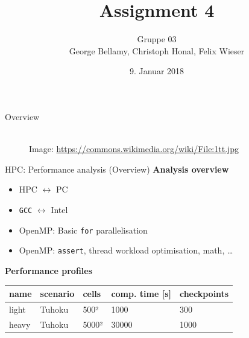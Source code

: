 \documentclass[shortpres,usenames,dvipsnames]{beamer}
\title[{Tsunami simulation}]{Assignment 4}
\author[Bellamy, Honal, Wieser]{Gruppe 03\\George Bellamy, Christoph Honal, Felix Wieser\\\vspace{10pt}{\small Bachelorpraktikum}}
\institute[TU M\"unchen]{Technical University of Munich}
\date{9. Januar 2018}
\begin{document}
		\maketitle
		
\begin{frame}{Overview}
	\begin{figure}
		\hspace{20pt}
		\hspace{40pt}\vspace{10pt}\\
		\vfill
		\flushleft
		{\fontsize{5}{5} \selectfont *Image: \url{https://commons.wikimedia.org/wiki/File:1tt.jpg}}
	\end{figure}
\end{frame}

\begin{frame}[fragile]{HPC: Performance analysis (Overview)}
	\textbf{Analysis overview}
	\begin{itemize}
		\item HPC $\leftrightarrow$ PC
		\item \verb|GCC| $\leftrightarrow$ Intel
		\item OpenMP: Basic \verb|for| parallelisation
		\item OpenMP: \verb|assert|, thread workload optimisation, math, \dots
	\end{itemize}
	
	\vspace{10pt}
	\textbf{Performance profiles}\\
	\begin{tabular}{lllll}
		name & scenario & cells & comp. time [s] & checkpoints\\
		\hline
		light & Tuhoku & 500² & 1000 & 300\\
		heavy & Tuhoku & 5000² & 30000 & 1000\\
	\end{tabular}
\end{frame}
\end{document}
